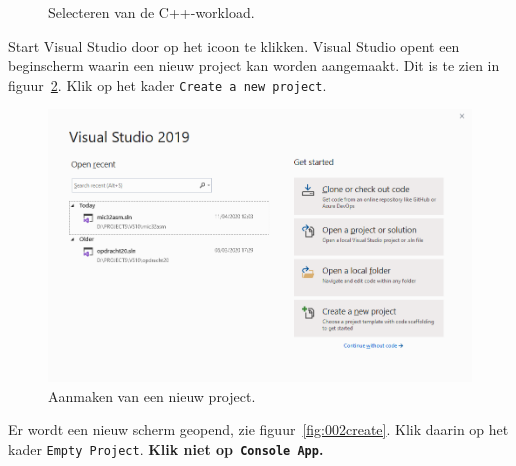\documentclass[a4paper,10pt,fleqn,twoside]{article}
\begin{document}
\begin{figure}[H]
\centering
{}
\caption{Selecteren van de C++-workload.}
\label{fig:000installworkload}
\end{figure}


Start Visual Studio door op het icoon te klikken. Visual Studio opent een beginscherm waarin een nieuw project kan worden aangemaakt. Dit is te zien in figuur~\ref{fig:001newproject}. Klik op het kader \texttt{Create a new project}.

\begin{figure}[H]
\centering
\includegraphics[scale=0.5]{001newproject}
\caption{Aanmaken van een nieuw project.}
\label{fig:001newproject}
\end{figure}

Er wordt een nieuw scherm geopend, zie figuur~\ref{fig:002create}. Klik daarin op het kader \texttt{Empty Project}. \textbf{Klik niet op\texttt{ Console App}.}
\end{document}
